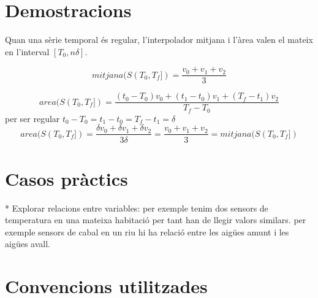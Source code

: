 \section{Demostracions}


Quan una sèrie temporal és regular, l'interpolador mitjana i l'àrea valen el mateix en l'interval $[T_0,n\delta]$.

\[
mitjana(S(T_0,T_f] ) = \frac{v_0+v_1+v_2}{3}
\]

\[
area(S(T_0,T_f] ) = \frac{(t_0-T_0)v_0+(t_1-t_0)v_1+(T_f-t_1)v_2}{T_f-T_0} 
\]
per ser regular $t_0 -T_0 = t_1 -t_0 = T_f - t_1 = \delta$
\[
area(S(T_0,T_f] ) = \frac{\delta v_0 + \delta v_1 + \delta v_2}{3\delta}
=\frac{v_0+v_1+v_2}{3} = mitjana(S(T_0,T_f] )
\]




\section{Casos pràctics}


* Explorar relacions entre variables: per exemple tenim dos sensors de temperatura en una mateixa habitació per tant han de llegir valors similars. per exemple sensors de cabal en un riu hi ha relació entre les aigües amunt i les aigües avall.





\section{Convencions utilitzades}








